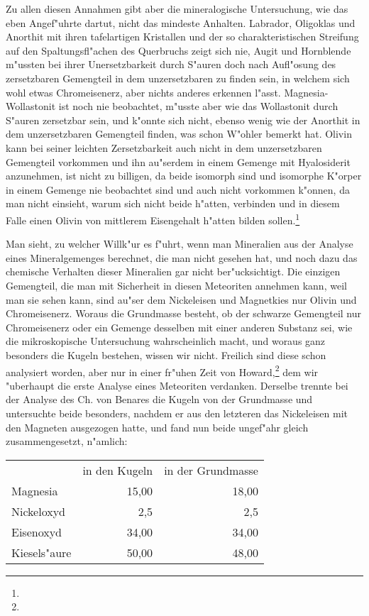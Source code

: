 \documentclass[a4paper, 11pt, oneside]{article}
\begin{document}
Zu allen diesen Annahmen gibt aber die mineralogische Untersuchung, wie das eben Angef"uhrte dartut, nicht das mindeste Anhalten. Labrador, Oligoklas und Anorthit mit ihren tafelartigen Kristallen und der so charakteristischen Streifung auf den Spaltungsfl"achen des Querbruchs zeigt sich nie, Augit und Hornblende m"ussten bei ihrer Unersetzbarkeit durch S"auren doch nach Aufl"osung des zersetzbaren Gemengteil in dem unzersetzbaren zu finden sein, in welchem sich wohl etwas Chromeisenerz, aber nichts anderes erkennen l"asst. Magnesia- Wollastonit ist noch nie beobachtet, m"usste aber wie das Wollastonit durch S"auren zersetzbar sein, und k"onnte sich nicht, ebenso wenig wie der Anorthit in dem unzersetzbaren Gemengteil finden, was schon W"ohler bemerkt hat. Olivin kann bei seiner leichten Zersetzbarkeit auch nicht in dem unzersetzbaren Gemengteil vorkommen und ihn au"serdem in einem Gemenge mit Hyalosiderit anzunehmen, ist nicht zu billigen, da beide isomorph sind und isomorphe K"orper in einem Gemenge nie beobachtet sind und auch nicht vorkommen k"onnen, da man nicht einsieht, warum sich nicht beide h"atten, verbinden und in diesem Falle einen Olivin von mittlerem Eisengehalt h"atten bilden sollen.\footnote{}

Man sieht, zu welcher Willk"ur es f"uhrt, wenn man Mineralien aus der Analyse eines Mineralgemenges berechnet, die man nicht gesehen hat, und noch dazu das chemische Verhalten dieser Mineralien gar nicht ber"ucksichtigt. Die einzigen Gemengteil, die man mit Sicherheit in diesen Meteoriten annehmen kann, weil man sie sehen kann, sind au"ser dem Nickeleisen und Magnetkies nur Olivin und Chromeisenerz. Woraus die Grundmasse besteht, ob der schwarze Gemengteil nur Chromeisenerz oder ein Gemenge desselben mit einer anderen Substanz sei, wie die mikroskopische Untersuchung wahrscheinlich macht, und woraus ganz besonders die Kugeln bestehen, wissen wir nicht. Freilich sind diese schon analysiert worden, aber nur in einer fr"uhen Zeit von Howard,\footnote{} dem wir "uberhaupt die erste Analyse eines Meteoriten verdanken. Derselbe trennte bei der Analyse des Ch. von Benares die Kugeln von der Grundmasse und untersuchte beide besonders, nachdem er aus den letzteren das Nickeleisen mit den Magneten ausgezogen hatte, und fand nun beide ungef"ahr gleich zusammengesetzt, n"amlich:
\begin{center}
\begin{tabular}{ l r r }
     & in den Kugeln & in der Grundmasse\\
    Magnesia & 15,00 & 18,00\\
    Nickeloxyd & 2,5 & 2,5\\
    Eisenoxyd & 34,00 & 34,00\\
    Kiesels"aure & 50,00 & 48,00\\
\end{tabular}
\end{center}
\end{document}
